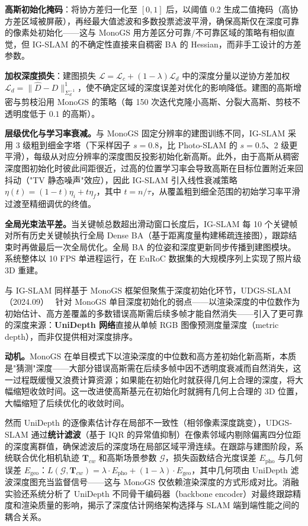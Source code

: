 \textbf{高斯初始化掩码}：将协方差归一化至 $[0, 1]$ 后，以阈值 $0.2$ 生成二值掩码（高协方差区域被屏蔽），再经最大值滤波和多数投票滤波平滑，确保高斯仅在深度可靠的像素处初始化——这与 MonoGS 用方差区分可靠/不可靠区域的策略有相似直觉，但 IG-SLAM 的不确定性直接来自稠密 BA 的 Hessian，而非手工设计的方差参数。

\textbf{加权深度损失}：建图损失 $\mathcal{L} = \mathcal{L}_c + (1-\lambda)\mathcal{L}_d$ 中的深度分量以逆协方差加权 $\mathcal{L}_d = \|\hat{D} - D\|_{\Sigma_d^{-1}}^1$，使不确定区域的深度误差对优化的影响降低。建图的高斯增密与剪枝沿用 MonoGS 的策略（每 150 次迭代克隆小高斯、分裂大高斯、剪枝不透明度低于 $0.1$ 的高斯）。

\textbf{层级优化与学习率衰减。}与 MonoGS 固定分辨率的建图训练不同，IG-SLAM 采用 3 级粗到细金字塔（下采样因子 $s=0.8$，比 Photo-SLAM 的 $s=0.5$、2 级更平滑），每级从对应分辨率的深度图反投影初始化新高斯。此外，由于高斯从稠密深度图初始化时彼此间距很近，过高的位置学习率会导致高斯在目标位置附近来回抖动（"TV 静态噪声"效应），因此 IG-SLAM 引入线性衰减策略 $\eta(t) = (1-t)\eta_i + t\eta_f$，其中 $t = n/\tau$，从覆盖粗到细全范围的初始学习率平滑过渡至精细调优的终值。

\textbf{全局光束法平差。}当关键帧总数超出滑动窗口长度后，IG-SLAM 每 10 个关键帧对所有历史关键帧执行全局 Dense BA（基于距离度量构建稀疏连接图），跟踪结束时再做最后一次全局优化。全局 BA 的位姿和深度更新同步传播到建图模块。系统整体以 10 FPS 单进程运行，在 EuRoC 数据集的大规模序列上实现了照片级 3D 重建。

与 IG-SLAM 同样基于 MonoGS 框架但聚焦于深度初始化环节，UDGS-SLAM（2024.09）~\cite{2409_00362} 针对 MonoGS 单目深度初始化的弱点——以渲染深度的中位数作为初始估计、高方差覆盖的多数错误高斯需后续多帧才能自然消失——引入了更可靠的深度来源：\textbf{UniDepth 网络}直接从单帧 RGB 图像预测度量深度（metric depth），而非仅提供相对深度排序。

\textbf{动机。}MonoGS 在单目模式下以渲染深度的中位数和高方差初始化新高斯，本质是"猜测"深度——大部分错误高斯需在后续多帧中因不透明度衰减而自然消失，这一过程既缓慢又浪费计算资源；如果能在初始化时就获得几何上合理的深度，将大幅缩短收敛时间。这一改进使高斯基元在初始化时就拥有几何上合理的 3D 位置，大幅缩短了后续优化的收敛时间。

然而 UniDepth 的逐像素估计存在局部不一致性（相邻像素深度跳变），UDGS-SLAM 通过\textbf{统计滤波}（基于 IQR 的异常值抑制）在像素邻域内剔除偏离四分位距的深度离群值，确保滤波后的深度场在局部区域平滑连续。在跟踪与建图阶段，系统联合优化相机轨迹 $\mathbf{T}_{cw}$ 和高斯场景参数 $\mathcal{G}$，损失函数结合光度误差 $E_{\mathrm{pho}}$ 与几何误差 $E_{\mathrm{geo}}$：$L(\mathcal{G}, \mathbf{T}_{cw}) = \lambda \cdot E_{\mathrm{pho}} + (1 - \lambda) \cdot E_{\mathrm{geo}}$，其中几何项由 UniDepth 滤波深度图充当监督信号——这与 MonoGS 仅依赖渲染深度的方式形成对比。消融实验还系统分析了 UniDepth 不同骨干编码器（backbone encoder）对最终跟踪精度和渲染质量的影响，揭示了深度估计网络架构选择与 SLAM 端到端性能之间的耦合关系。

